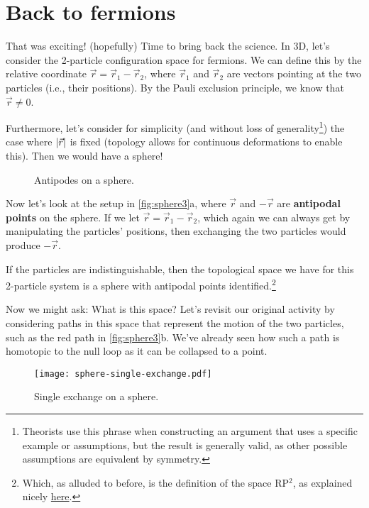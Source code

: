 \documentclass[12pt, english]{book}
\begin{document}
\section{Back to fermions}

That was exciting! (hopefully)
Time to bring back the science.
In 3D, let's consider the 2-particle configuration space for fermions.
We can define this by the relative coordinate $\vec{r} = \vec{r}_1 - \vec{r}_2$, where $\vec{r}_1$ and $\vec{r}_2$ are vectors pointing at the two particles (i.e., their positions).
By the Pauli exclusion principle, we know that $\vec{r} \neq 0$.

Furthermore, let's consider for simplicity (and without loss of generality\footnote{Theorists use this phrase when constructing an argument that uses a specific example or assumptions, but the result is generally valid, as other possible assumptions are equivalent by symmetry.}) the case where $\abs{\vec{r}}$ is fixed (topology allows for continuous deformations to enable this).
Then we would have a sphere!

\begin{figure}[!ht]
	\centering 
	 \hspace{5ex} 
	\caption{Antipodes on a sphere.}
	\label{fig:sphere3}
\end{figure}

Now let's look at the setup in \autoref{fig:sphere3}a, where $\vec{r}$ and $-\vec{r}$ are \textbf{antipodal points} on the sphere.
If we let $\vec{r} = \vec{r}_1 - \vec{r}_2$, which again we can always get by manipulating the particles' positions, then exchanging the two particles would produce $-\vec{r}$.

If the particles are indistinguishable, then the topological space we have for this 2-particle system is a sphere with antipodal points identified.\footnote{Which, as alluded to before, is the definition of the space RP$^2$, as explained nicely \href{https://www.popmath.org.uk/sculpmath/pagesm/plane.html}{here}.}

Now we might ask: What is this space?
Let's revisit our original activity by considering paths in this space that represent the motion of the two particles, such as the red path in \autoref{fig:sphere3}b.
We've already seen how such a path is homotopic to the null loop as it can be collapsed to a point.

\begin{figure}[!ht]
	\centering 
	\texttt{[image: sphere-single-exchange.pdf]}
	\caption{Single exchange on a sphere.}
	\label{fig:sphere-exchange}
\end{figure}
\end{document}
